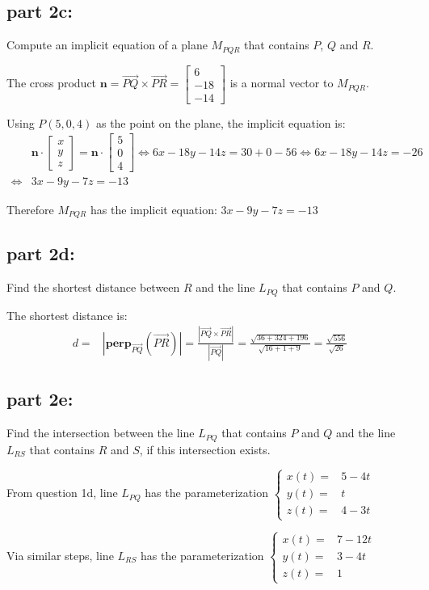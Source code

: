 \documentclass{article}
\newcommand{\abs}[1]{\left|#1\right|}
\newcommand{\colvec}[3]{\begin{bmatrix} #1 \\ #2 \\ #3 \end{bmatrix}}
\newcommand{\pvec}[1]{\overrightarrow{#1}}
\newcommand{\dr}[1]{\textcolor{dark_red}{#1}}
\begin{document}
\subsection*{part 2c:}

Compute an implicit equation of a plane \(M_{PQR}\) that contains \(P\), \(Q\) and \(R\).

\dr{The cross product \(\mathbf{n} = \pvec{PQ} \times \pvec{PR} = \colvec{6}{-18}{-14}\) is a normal vector to \(M_{PQR}\).}  

\dr{Using \(P(5,0,4)\) as the point on the plane, the implicit equation is:
\begin{align*}
& \mathbf{n} \cdot \colvec{x}{y}{z} = \mathbf{n} \cdot \colvec{5}{0}{4} 
\iff 6x - 18y - 14z = 30 + 0 - 56 
\iff 6x - 18y - 14z = -26 \\
\iff & 3x - 9y - 7z = -13
\end{align*}}

\dr{Therefore \(M_{PQR}\) has the implicit equation: \(3x - 9y - 7z = -13\)}


\subsection*{part 2d:}

Find the shortest distance between \(R\) and the line \(L_{PQ}\) that contains \(P\) and \(Q\).

\dr{The shortest distance is:
\begin{align*}
d = & \abs{\textbf{perp}_{\pvec{PQ}}(\pvec{PR})} 
= \frac{\abs{\pvec{PQ} \times \pvec{PR}}}{\abs{\pvec{PQ}}} 
= \frac{\sqrt{36 + 324 + 196}}{\sqrt{16 + 1 + 9}} 
= \frac{\sqrt{556}}{\sqrt{26}}
\end{align*}}


\subsection*{part 2e:}

Find the intersection between the line \(L_{PQ}\) that contains \(P\) and \(Q\) and the line \(L_{RS}\) that contains \(R\) and \(S\), if this intersection exists.

\dr{From question 1d, line \(L_{PQ}\) has the parameterization \(\left\{\begin{array}{rl} x(t) = & 5 - 4t \\ y(t) = & t \\ z(t) = & 4 - 3t \end{array}\right.\)} 

\dr{Via similar steps, line \(L_{RS}\) has the parameterization \(\left\{\begin{array}{rl} x(t) = & 7 - 12t \\ y(t) = & 3 - 4t \\ z(t) = & 1 \end{array}\right.\)}
\end{document}
